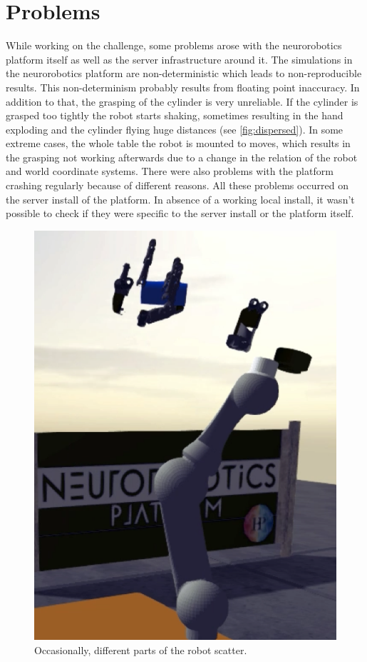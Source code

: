 \section{Problems}\label{sec:problems}
While working on the challenge, some problems arose with the neurorobotics platform itself as well as the server infrastructure around it.
The simulations in the neurorobotics platform are non-deterministic which leads to non-reproducible results.
This non-determinism probably results from floating point inaccuracy.
In addition to that, the grasping of the cylinder is very unreliable.
If the cylinder is grasped too tightly the robot starts shaking, sometimes resulting in the hand exploding and the cylinder flying huge distances (see \autoref{fig:dispersed}).
In some extreme cases, the whole table the robot is mounted to moves, which results in the grasping not working afterwards due to a change in the relation of the robot and world coordinate systems.
There were also problems with the platform crashing regularly because of different reasons.
All these problems occurred on the server install of the platform.
In absence of a working local install, it wasn't possible to check if they were specific to the server install or the platform itself.

\begin{figure}[h]
\centering
\includegraphics[width=.95\columnwidth]{figures/dispersed_robot_crop.png}
\caption{Occasionally, different parts of the robot scatter.}
\label{fig:dispersed}
\end{figure}
